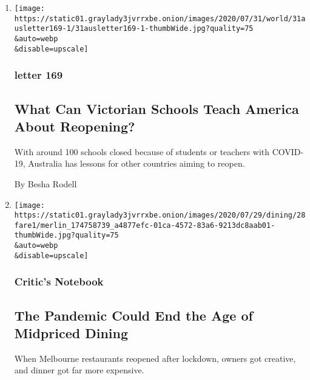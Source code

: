 \begin{enumerate}
\def\labelenumi{\arabic{enumi}.}
\item
  \href{/2020/07/30/world/australia/melbourne-schools-lessons-america.html}{}

  \texttt{[image: https://static01.graylady3jvrrxbe.onion/images/2020/07/31/world/31ausletter169-1/31ausletter169-1-thumbWide.jpg?quality=75\\\&auto=webp\\\&disable=upscale]}

  \hypertarget{letter-169}{%
  \subsubsection{letter 169}\label{letter-169}}

  \hypertarget{what-can-victorian-schools-teach-america-about-reopening}{%
  \subsection{What Can Victorian Schools Teach America About
  Reopening?}\label{what-can-victorian-schools-teach-america-about-reopening}}

  With around 100 schools closed because of students or teachers with
  COVID-19, Australia has lessons for other countries aiming to reopen.

  By Besha Rodell
\item
  \href{/2020/07/28/dining/melbourne-restaurants-coronavirus.html}{}

  \texttt{[image: https://static01.graylady3jvrrxbe.onion/images/2020/07/29/dining/28fare1/merlin\_174758739\_a4877efc-01ca-4572-83a6-9213dc8aab01-thumbWide.jpg?quality=75\\\&auto=webp\\\&disable=upscale]}

  \hypertarget{critics-notebook}{%
  \subsubsection{Critic's Notebook}\label{critics-notebook}}

  \hypertarget{the-pandemic-could-end-the-age-of-midpriced-dining}{%
  \subsection{The Pandemic Could End the Age of Midpriced
  Dining}\label{the-pandemic-could-end-the-age-of-midpriced-dining}}

  When Melbourne restaurants reopened after lockdown, owners got
  creative, and dinner got far more expensive.


\end{enumerate}
